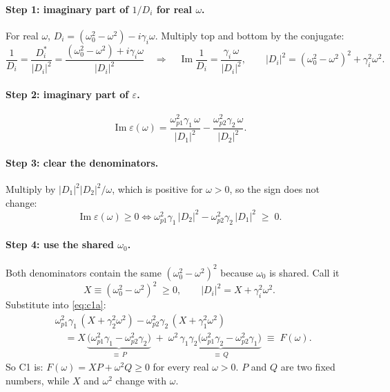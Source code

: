 \documentclass[11pt]{article}
\newcommand{\wpa}{\omega_{p1}}
\newcommand{\wpb}{\omega_{p2}}
\renewcommand{\Im}{\operatorname{Im}}
\begin{document}
\paragraph{Step 1: imaginary part of $1/D_i$ for real $\omega$.}
For real $\omega$, $D_i = (\omega_0^2-\omega^2) - i\gamma_i\omega$. Multiply top and bottom by the conjugate:
\begin{equation}
  \frac{1}{D_i} = \frac{D_i^*}{|D_i|^2}
  = \frac{(\omega_0^2-\omega^2) + i\gamma_i\omega}{|D_i|^2}
  \quad\Longrightarrow\quad
  \Im\frac{1}{D_i} = \frac{\gamma_i\,\omega}{|D_i|^2},
  \qquad |D_i|^2 = (\omega_0^2-\omega^2)^2 + \gamma_i^2\omega^2 .
\end{equation}

\paragraph{Step 2: imaginary part of $\varepsilon$.}
\begin{equation}
  \Im\varepsilon(\omega) = \frac{\wpa^2\gamma_1\,\omega}{|D_1|^2} - \frac{\wpb^2\gamma_2\,\omega}{|D_2|^2}.
\end{equation}

\paragraph{Step 3: clear the denominators.}
Multiply by $|D_1|^2|D_2|^2/\omega$, which is positive for $\omega>0$, so the sign does not change:
\begin{equation}
  \Im\varepsilon(\omega)\ge 0
  \iff
  \wpa^2\gamma_1\,|D_2|^2 - \wpb^2\gamma_2\,|D_1|^2 \;\ge\; 0 .
  \label{eq:c1a}
\end{equation}

\paragraph{Step 4: use the shared $\omega_0$.}
Both denominators contain the same $(\omega_0^2-\omega^2)^2$ because $\omega_0$ is shared. Call it
\begin{equation}
  X \equiv (\omega_0^2-\omega^2)^2 \;\ge 0,
  \qquad |D_i|^2 = X + \gamma_i^2\omega^2 .
\end{equation}
Substitute into \eqref{eq:c1a}:
\begin{align}
  &\wpa^2\gamma_1\,(X+\gamma_2^2\omega^2) - \wpb^2\gamma_2\,(X+\gamma_1^2\omega^2) \nonumber\\
  &\quad= X\,\underbrace{\big(\wpa^2\gamma_1 - \wpb^2\gamma_2\big)}_{\equiv\,P}
   \;+\; \omega^2\,\underbrace{\gamma_1\gamma_2\big(\wpa^2\gamma_2 - \wpb^2\gamma_1\big)}_{\equiv\,Q}
   \;\equiv\; F(\omega).
  \label{eq:F}
\end{align}
So C1 is: $F(\omega) = X P + \omega^2 Q \ge 0$ for every real $\omega>0$.
$P$ and $Q$ are two fixed numbers, while $X$ and $\omega^2$ change with $\omega$.
\end{document}
